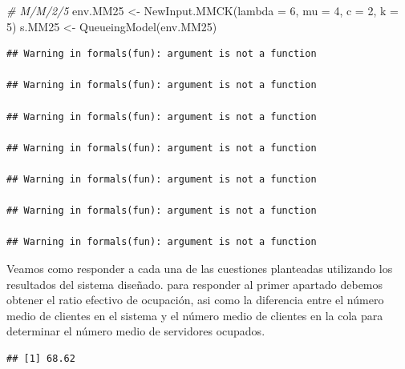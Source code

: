 \documentclass[
]{book}
\newenvironment{Shaded}{\begin{snugshade}}{\end{snugshade}}
\newcommand{\AttributeTok}[1]{\textcolor[rgb]{0.77,0.63,0.00}{#1}}
\newcommand{\CommentTok}[1]{\textcolor[rgb]{0.56,0.35,0.01}{\textit{#1}}}
\newcommand{\DecValTok}[1]{\textcolor[rgb]{0.00,0.00,0.81}{#1}}
\newcommand{\FunctionTok}[1]{\textcolor[rgb]{0.00,0.00,0.00}{#1}}
\newcommand{\NormalTok}[1]{#1}
\newcommand{\OtherTok}[1]{\textcolor[rgb]{0.56,0.35,0.01}{#1}}
\newcommand{\SpecialCharTok}[1]{\textcolor[rgb]{0.00,0.00,0.00}{#1}}
\theoremstyle{definition}
\theoremstyle{definition}
\theoremstyle{definition}
\theoremstyle{definition}
\theoremstyle{remark}
\begin{document}
\begin{Shaded}
\begin{Highlighting}[]
\CommentTok{\# M/M/2/5}
\NormalTok{env.MM25 }\OtherTok{\textless{}{-}} \FunctionTok{NewInput.MMCK}\NormalTok{(}\AttributeTok{lambda =} \DecValTok{6}\NormalTok{, }\AttributeTok{mu =} \DecValTok{4}\NormalTok{, }\AttributeTok{c =} \DecValTok{2}\NormalTok{, }\AttributeTok{k =} \DecValTok{5}\NormalTok{)}
\NormalTok{s.MM25 }\OtherTok{\textless{}{-}} \FunctionTok{QueueingModel}\NormalTok{(env.MM25)}
\end{Highlighting}
\end{Shaded}

\begin{verbatim}
## Warning in formals(fun): argument is not a function

## Warning in formals(fun): argument is not a function

## Warning in formals(fun): argument is not a function

## Warning in formals(fun): argument is not a function

## Warning in formals(fun): argument is not a function

## Warning in formals(fun): argument is not a function

## Warning in formals(fun): argument is not a function
\end{verbatim}

Veamos como responder a cada una de las cuestiones planteadas utilizando los resultados del sistema diseñado. para responder al primer apartado debemos obtener el ratio efectivo de ocupación, asi como la diferencia entre el número medio de clientes en el sistema y el número medio de clientes en la cola para determinar el número medio de servidores ocupados.

\begin{Shaded}
\end{Shaded}

\begin{verbatim}
## [1] 68.62
\end{verbatim}

\begin{Shaded}
\end{Shaded}
\end{document}
